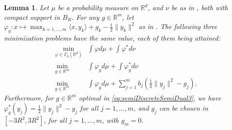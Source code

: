 \documentclass[11pt]{article}
\newtheorem{lemma}{Lemma}[section]
\newcommand{\R}{\mathbb R}
\newcommand{\1}{\mathbbm{1}}
\numberwithin{equation}{section}
\begin{document}
\begin{lemma}
    Let $\mu$ be a probability measure on $\R^d$, and $\nu$ be as in , both with compact support in $B_R$. For any $g \in \R^m$, let $\varphi_g \colon x \mapsto \max_{k=1,\ldots,m}\langle x,y_k \rangle+g_k-\frac{1}{2}\|y_k\|^2$ as in .
    The following three minimization problems have the same value, each of them being attained:
    \begin{align}
        \min_{\varphi \in \Gamma_0(\R^d)} &\int \varphi d\mu + \int \varphi^* d\nu \label{eq:semiDiscreteSemiDual1}\\ 
        \min_{g \in \R^m} \,\,\,\,
        &\int  \varphi_g d\mu + \int \varphi_g^* d\nu \label{eq:semiDiscreteSemiDual2}\\
        \min_{g \in \R^m} \,\,\,\,&\int  \varphi_g d\mu + \sum_{j=1}^m b_j \left(\frac{1}{2} \|y_j\|^2- g_j\right).\label{eq:semiDiscreteSemiDual3}
    \end{align}
    Furthermore, for $g\in\R^m$ optimal in \eqref{eq:semiDiscreteSemiDual3}, we have $\varphi^*_{g} (y_j) =\frac{1}{2} \|y_j\|^2- g_j$ for all $j = 1,\ldots, m$, and $g_j$ can be chosen in $[-3R^2,3R^2]$, for all $j=1,\ldots,m$, with $g_m = 0$.
    \label{lem:semidiscreteSemidual} 
\end{lemma}
\end{document}
